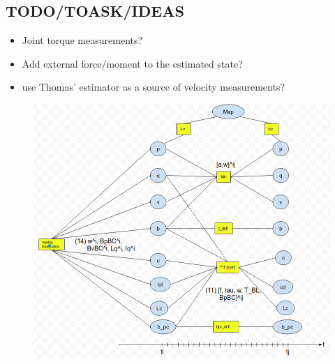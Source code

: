 \documentclass[11pt]{article}
\begin{document}
\subsection{TODO/TOASK/IDEAS}
\begin{itemize}
    \item Joint torque measurements?
    \item Add external force/moment to the estimated state? 
    \item use Thomas' estimator as a source of velocity measurements?
\end{itemize}


\begin{figure}[ht]
    \centering
    \includegraphics[width=1\linewidth]{img/HumanoidStateFactorGraph.png}
    \label{fig:my_label}
\end{figure}
\end{document}
